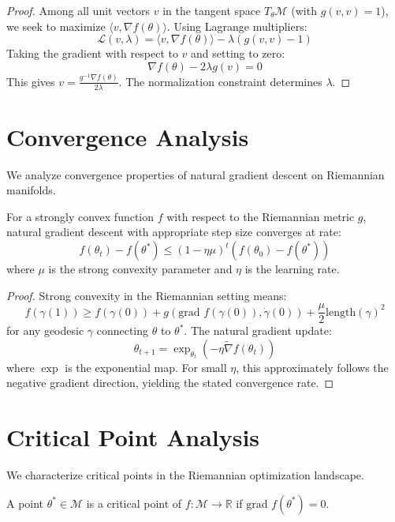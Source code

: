 \begin{proof}
Among all unit vectors $v$ in the tangent space $T_\theta \mathcal{M}$ (with $g(v,v) = 1$), we seek to maximize $\langle v, \nabla f(\theta) \rangle$. Using Lagrange multipliers:
$$\mathcal{L}(v, \lambda) = \langle v, \nabla f(\theta) \rangle - \lambda(g(v,v) - 1)$$
Taking the gradient with respect to $v$ and setting to zero:
$$\nabla f(\theta) - 2\lambda g(v) = 0$$
This gives $v = \frac{g^{-1}\nabla f(\theta)}{2\lambda}$. The normalization constraint determines $\lambda$.
\end{proof}

\section{Convergence Analysis}

We analyze convergence properties of natural gradient descent on Riemannian manifolds.

\begin{theorem}
\label{thm:convergence_rate}
For a strongly convex function $f$ with respect to the Riemannian metric $g$, natural gradient descent with appropriate step size converges at rate:
$$f(\theta_t) - f(\theta^*) \leq (1 - \eta \mu)^t (f(\theta_0) - f(\theta^*))$$
where $\mu$ is the strong convexity parameter and $\eta$ is the learning rate.
\end{theorem}

\begin{proof}
Strong convexity in the Riemannian setting means:
$$f(\gamma(1)) \geq f(\gamma(0)) + g(\text{grad } f(\gamma(0)), \dot{\gamma}(0)) + \frac{\mu}{2} \text{length}(\gamma)^2$$
for any geodesic $\gamma$ connecting $\theta$ to $\theta^*$. The natural gradient update:
$$\theta_{t+1} = \exp_{\theta_t}(-\eta \tilde{\nabla} f(\theta_t))$$
where $\exp$ is the exponential map. For small $\eta$, this approximately follows the negative gradient direction, yielding the stated convergence rate.
\end{proof}

\section{Critical Point Analysis}

We characterize critical points in the Riemannian optimization landscape.

\begin{definition}
\label{def:riemannian_critical_points}
A point $\theta^* \in \mathcal{M}$ is a critical point of $f: \mathcal{M} \to \mathbb{R}$ if $\text{grad } f(\theta^*) = 0$.
\end{definition}

